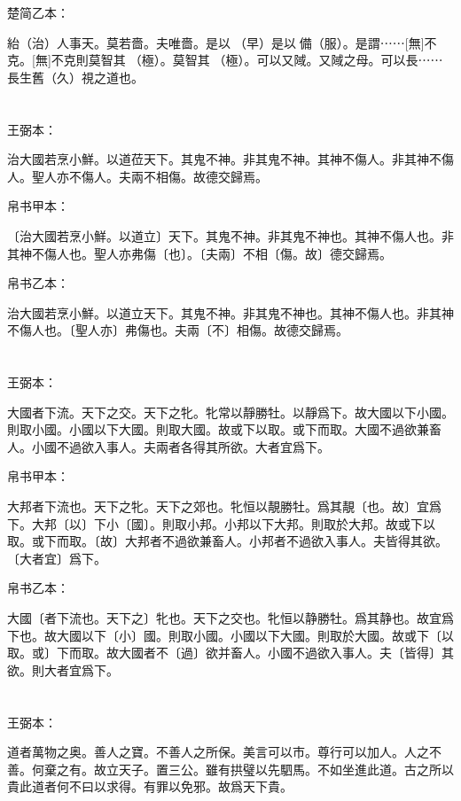 \documentclass[a5paper]{ctexbook}
\begin{document}
    楚简乙本：

    紿（治）人事天。莫若嗇。夫唯嗇。是以󶵙（早）是以󶵙備（服）。是謂⋯⋯[無]不克。[無]不克則莫智其𠄨（極）。莫智其𠄨（極）。可以又䧕。又䧕之母。可以長⋯⋯長生舊（久）視之道也。

    \chapter{}
    王弼本：

    治大國若烹小鮮。以道莅天下。其鬼不神。非其鬼不神。其神不傷人。非其神不傷人。聖人亦不傷人。夫兩不相傷。故德交歸焉。

    
    帛书甲本：

    〔治大國若烹小鮮。以道立〕天下。其鬼不神。非其鬼不神也。其神不傷人也。非其神不傷人也。聖人亦弗傷〔也〕。〔夫兩〕不相〔傷。故〕德交歸焉。

    帛书乙本：

    治大國若烹小鮮。以道立天下。其鬼不神。非其鬼不神也。其神不傷人也。非其神不傷人也。〔聖人亦〕弗傷也。夫兩〔不〕相傷。故德交歸焉。

    \chapter{}
    王弼本：

    大國者下流。天下之交。天下之牝。牝常以靜勝牡。以靜爲下。故大國以下小國。則取小國。小國以下大國。則取大國。故或下以取。或下而取。大國不過欲兼畜人。小國不過欲入事人。夫兩者各得其所欲。大者宜爲下。

    
    帛书甲本：

    大邦者下流也。天下之牝。天下之郊也。牝恒以靚勝牡。爲其靚〔也。故〕宜爲下。大邦〔以〕下小〔國〕。則取小邦。小邦以下大邦。則取於大邦。故或下以取。或下而取。〔故〕大邦者不過欲兼畜人。小邦者不過欲入事人。夫皆得其欲。〔大者宜〕爲下。

    帛书乙本：

    大國〔者下流也。天下之〕牝也。天下之交也。牝恒以静勝牡。爲其静也。故宜爲下也。故大國以下〔小〕國。則取小國。小國以下大國。則取於大國。故或下〔以取。或〕下而取。故大國者不〔過〕欲并畜人。小國不過欲入事人。夫〔皆得〕其欲。則大者宜爲下。

    \chapter{}
    王弼本：

    道者萬物之奥。善人之寶。不善人之所保。美言可以市。尊行可以加人。人之不善。何棄之有。故立天子。置三公。雖有拱璧以先駟馬。不如坐進此道。古之所以貴此道者何不曰以求得。有罪以免邪。故爲天下貴。
\end{document}
